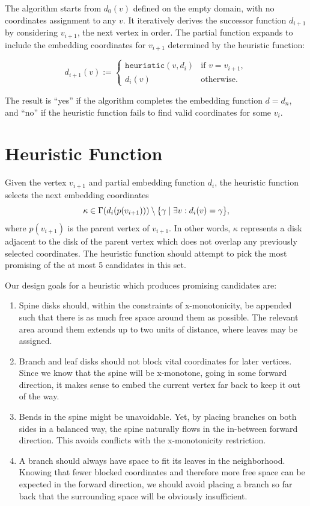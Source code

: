 The algorithm starts from $d_0(v)$ defined on the empty domain, with no coordinates assignment to any $v$. It iteratively derives the successor function $d_{i+1}$ by considering $v_{i+1}$, the next vertex in order.
The partial function expands to include the embedding coordinates for $v_{i+1}$ determined by the heuristic function:

\begin{equation*}
    d_{i+1}(v) := \begin{cases} \texttt{heuristic}(v, d_i) & \text{if } v = v_{i+1},\\ d_i(v)& \text{otherwise}. \end{cases}
\end{equation*}

The result is ``yes'' if the algorithm completes the embedding function $d = d_n$, and ``no'' if the heuristic function fails to find valid coordinates for some $v_i$.

\section{Heuristic Function}

Given the vertex $v_{i+1}$ and partial embedding function $d_i$, the heuristic function selects the next embedding coordinates $$\kappa \in \Gamma(d_i(p(v_{i+1}))) \setminus \{ \gamma \mid \exists v: d_i(v) = \gamma \},$$ where $p(v_{i+1})$ is the parent vertex of $v_{i+1}$. In other words, $\kappa$ represents a disk adjacent to the disk of the parent vertex which does not overlap any previously selected coordinates. The heuristic function should attempt to pick the most promising of the at most 5 candidates in this set.

Our design goals for a heuristic which produces promising candidates are:

\begin{enumerate}
    \item\label{dg_bend} Spine disks should, within the constraints of x-monotonicity, be appended such that there is as much free space around them as possible. The relevant area around them extends up to two units of distance, where leaves may be assigned.
    \item\label{dg_back} Branch and leaf disks should not block vital coordinates for later vertices. Since we know that the spine will be x-monotone, going in some forward direction, it makes sense to embed the current vertex far back to keep it out of the way.
    \item\label{dg_balance} Bends in the spine might be unavoidable. Yet, by placing branches on both sides in a balanced way, the spine naturally flows in the in-between forward direction. This avoids conflicts with the x-monotonicity restriction.
    \item\label{dg_space} A branch should always have space to fit its leaves in the neighborhood. Knowing that fewer blocked coordinates and therefore more free space can be expected in the forward direction, we should avoid placing a branch so far back that the surrounding space will be obviously insufficient.
\end{enumerate}

